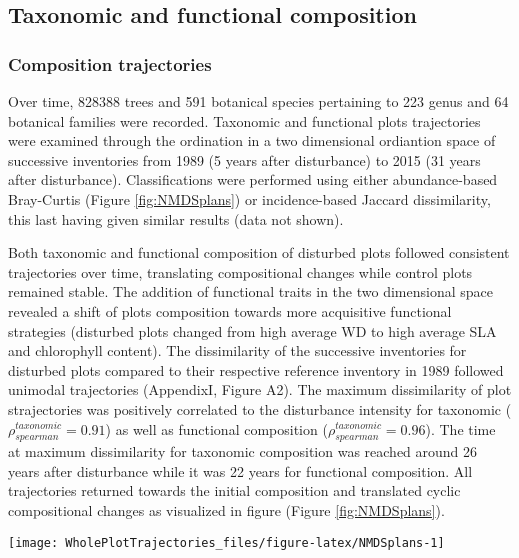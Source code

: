 \documentclass[fleqn,10pt]{ArtEcoFoG} %
\theoremstyle{definition}
\theoremstyle{definition}
\theoremstyle{definition}
\theoremstyle{remark}
\begin{document}
\subsection{Taxonomic and functional
composition}\label{taxonomic-and-functional-composition}

\subsubsection{Composition trajectories}\label{composition-trajectories}

Over time, 828388 trees and 591 botanical species pertaining to 223
genus and 64 botanical families were recorded. Taxonomic and functional
plots trajectories were examined through the ordination in a two
dimensional ordiantion space of successive inventories from 1989 (5
years after disturbance) to 2015 (31 years after disturbance).
Classifications were performed using either abundance-based Bray-Curtis
(Figure \ref{fig:NMDSplans}) or incidence-based Jaccard dissimilarity,
this last having given similar results (data not shown).

Both taxonomic and functional composition of disturbed plots followed
consistent trajectories over time, translating compositional changes
while control plots remained stable. The addition of functional traits
in the two dimensional space revealed a shift of plots composition
towards more acquisitive functional strategies (disturbed plots changed
from high average WD to high average SLA and chlorophyll content). The
dissimilarity of the successive inventories for disturbed plots compared
to their respective reference inventory in 1989 followed unimodal
trajectories (AppendixI, Figure A2). The maximum dissimilarity of plot
strajectories was positively correlated to the disturbance intensity for
taxonomic (\(\rho_{spearman}^{taxonomic}=0.91\)) as well as functional
composition (\(\rho_{spearman}^{taxonomic}=0.96\)). The time at maximum
dissimilarity for taxonomic composition was reached around 26 years
after disturbance while it was 22 years for functional composition. All
trajectories returned towards the initial composition and translated
cyclic compositional changes as visualized in figure (Figure
\ref{fig:NMDSplans}).

\begin{figure*}

{\centering \texttt{[image: WholePlotTrajectories\_files/figure-latex/NMDSplans-1]} 

}

\caption{Trajectories of the plots in terms of \textbf{(a)} flora composition and \textbf{(b)} functional composition regarding the 6 leaf and stem functional traits,the maximum allometric height and seed mass class in the two-dimensional space from the NMDS performed for the 30 years after disturbance. Distance matrix for NMDS were computed from the Bray-curtis dissimilarity between successive inventories. Line colors represent the disturbance treatment (green for control, blue for T1,orange for T2 and red for T3).}\label{fig:NMDSplans}
\end{figure*}
\end{document}
